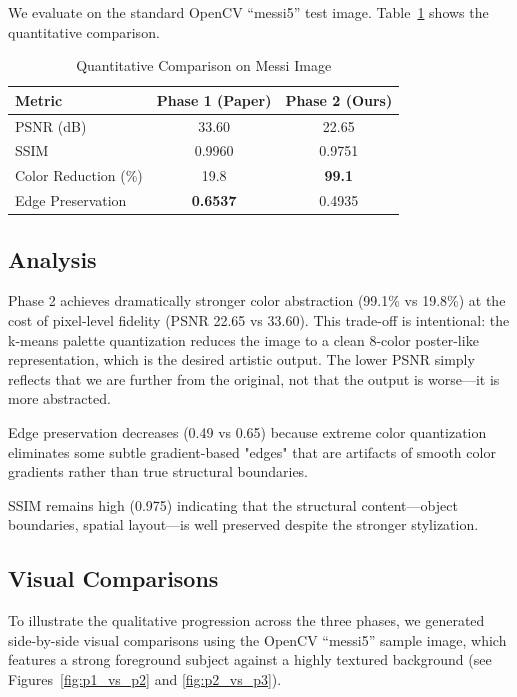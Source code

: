 \documentclass[conference]{IEEEtran}
\begin{document}
We evaluate on the standard OpenCV ``messi5'' test image. Table~\ref{tab:metrics} shows the quantitative comparison.

\begin{table}[h]
\caption{Quantitative Comparison on Messi Image}
\label{tab:metrics}
\begin{center}
\begin{tabular}{lcc}
\toprule
\textbf{Metric} & \textbf{Phase 1 (Paper)} & \textbf{Phase 2 (Ours)} \\
\midrule
PSNR (dB)         & 33.60 & 22.65 \\
SSIM              & 0.9960 & 0.9751 \\
Color Reduction (\%) & 19.8 & \textbf{99.1} \\
Edge Preservation & \textbf{0.6537} & 0.4935 \\
\bottomrule
\end{tabular}
\end{center}
\end{table}

\subsection{Analysis}

Phase 2 achieves dramatically stronger color abstraction (99.1\% vs 19.8\%) at the cost of pixel-level fidelity (PSNR 22.65 vs 33.60). This trade-off is intentional: the k-means palette quantization reduces the image to a clean 8-color poster-like representation, which is the desired artistic output. The lower PSNR simply reflects that we are further from the original, not that the output is worse—it is more abstracted.

Edge preservation decreases (0.49 vs 0.65) because extreme color quantization eliminates some subtle gradient-based "edges" that are artifacts of smooth color gradients rather than true structural boundaries.

SSIM remains high (0.975) indicating that the structural content—object boundaries, spatial layout—is well preserved despite the stronger stylization.

\subsection{Visual Comparisons}

To illustrate the qualitative progression across the three phases, we generated side-by-side visual comparisons using the OpenCV ``messi5'' sample image, which features a strong foreground subject against a highly textured background (see Figures~\ref{fig:p1_vs_p2} and \ref{fig:p2_vs_p3}).
\end{document}
